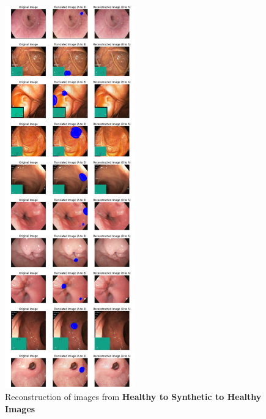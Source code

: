 \documentclass[UKenglish,12pt]{master-style}
\begin{document}
\begin{figure}[htbp]
    \centering
    \includegraphics[width=0.5\textwidth]{Images/A-B-A.jpeg}
    \caption{Reconstruction of images from \textbf{Healthy to Synthetic to Healthy Images}}
    \label{fig:A-B-A}
\end{figure}
\end{document}

